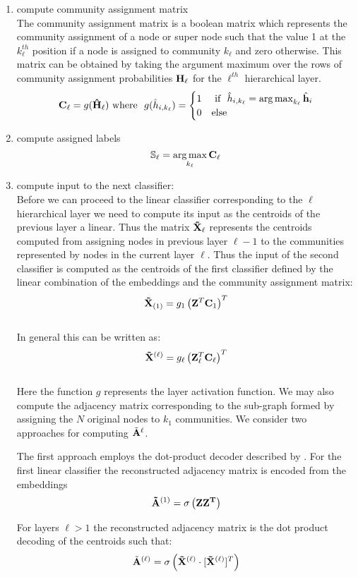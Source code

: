 \documentclass[a4paper,12pt]{article}
\DeclareMathOperator*{\argmax}{arg\,max}
\begin{document}
\begin{itemize}
\begin{enumerate}
{\begin{enumerate}
				
				\item[]{compute community assignment matrix \\ 
					The community assignment matrix is a boolean matrix which represents the community assignment of a node or super node such that the value 1 at the $k_\ell^{th}$ position if a node is assigned to community $k_\ell$ and zero otherwise. This matrix can be obtained by taking the argument maximum over the rows of community assignment probabilities ${\bf H}_\ell$ for the $\ell^{th}$ hierarchical layer.  
					\[{\bf C}_{\ell} = g({\bf \hat{H}}_{\ell}) \ \text{where} \ \  g(\hat{h}_{i,k_\ell}) = 
					\begin{cases} 1 & \ \text{if} \ \ \hat{h}_{i,k_\ell} = \argmax_{k_\ell} \hat{\bf h}_i \\ %
						0 & \text{else} %
					\end{cases}\]}
				
				\item[]{compute assigned labels \[ \mathbb{S}_\ell = \argmax_{k_\ell} {\bf C}_{\ell}\]}
				
				\item[]{compute input to the next classifier:  \\
					Before we can proceed to the linear classifier corresponding to the $\ell$ hierarchical layer we need to compute its input as the centroids of the previous layer a linear. Thus the matrix ${\bf \tilde X}_\ell$ represents the centroids computed from assigning nodes in previous layer $\ell - 1$ to the communities represented by nodes in the current layer $\ell$. Thus the input of the second classifier is computed as the centroids of the first classifier defined by the linear combination of the embeddings and the community assignment matrix: 
					\[ {\bf \tilde X}_{(1)} = g_1\left({\bf Z}^T {\bf C}_{1}\right)^T\] 
					\\
					In general this can be written as: 
					\[ {\bf \tilde X}^{(\ell)} = g_\ell\left({\bf Z}_{\ell}^T {\bf C}_{\ell}\right)^T\] 
					\\
					Here the function $g$ represents the layer activation function. We may also compute the adjacency matrix corresponding to the sub-graph formed by assigning the $N$ original nodes to $k_1$ communities. We consider two approaches for computing ${\tilde{\bf A}^{\ell}}$. 
					
					The first approach employs the dot-product decoder described by \cite{kipf2016variational,zhou2023community}. For the first linear classifier the reconstructed adjacency matrix is encoded from the embeddings
					\[ {\bf \tilde A}^{(1)} = \sigma \left( {\bf Z}\bf{Z}^T \right) \]}
					For layers $\ell > 1$ the reconstructed adjacency matrix is the dot product decoding of the centroids such that:
					\[\tilde{\bf A}^{(\ell)} = \sigma\left({\bf \tilde X}^{(\ell)}\cdot [{\bf \tilde X}^{(\ell)}]^T\right) \]
					

\end{enumerate}}
\end{enumerate}
\end{itemize}
\end{document}
